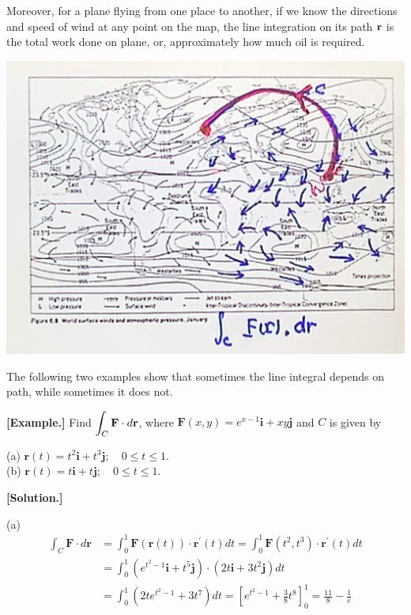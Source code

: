 \documentclass[11pt, a4paper]{MATH2023}
\newcommand{\eg}{\textbf{[Example.] }}
\newcommand{\sol}{\textbf{[Solution.] }}
\newcommand{\rr}{{\bf r}}
\begin{document}
\begin{spacing}{1.3}
    Moreover, for a plane flying from one place to another, if we know the directions and speed of wind
    at any point on the map, the line integration on its path $\rr$ is the total work done on plane,
    or, approximately how much oil is required.
    \begin{center}
        \includegraphics[scale=0.14]{images/Ch15-plane-oil.JPG}
    \end{center}


    \newpage
    {\blue The following two examples show that sometimes the line integral depends on path,
    while sometimes it does not.}

    \eg Find $\displaystyle \int_{C} \mathbf{F} \cdot d \mathbf{r}$, where $\mathbf{F}(x, y)=e^{x-1} \mathbf{i}+x y \mathbf{j}$ 
    and $C$ is given by

    (a) $\mathbf{r}(t)=t^{2} \mathbf{i}+t^{3} \mathbf{j} ; \quad 0 \leqslant t \leqslant 1$.\\
    (b) $\mathbf{r}(t)=t \mathbf{i}+t \mathbf{j} ; \quad 0 \leqslant t \leqslant 1 .$

    \sol 

    (a)
    $$\begin{aligned}
    \int_{C} \mathbf{F} \cdot d \mathbf{r} &=\int_{0}^{1} \mathbf{F}(\mathbf{r}(t)) \cdot \mathbf{r}^{\prime}(t) d t=\int_{0}^{1} \mathbf{F}\left(t^{2}, t^{3}\right) \cdot \mathbf{r}^{\prime}(t) d t \\
    &=\int_{0}^{1}\left(e^{t^{2}-1} \mathbf{i}+t^{5} \mathbf{j}\right) \cdot\left(2 t \mathbf{i}+3 t^{2} \mathbf{j}\right) d t \\
    &=\int_{0}^{1}\left(2 t e^{t^{2}-1}+3 t^{7}\right) d t =\left[e^{t^{2}-1}+\frac{3}{8} t^{8}\right]_{0}^{1}=\frac{11}{8}-\frac{1}{e}
    \end{aligned}$$


\end{spacing}
\end{document}
